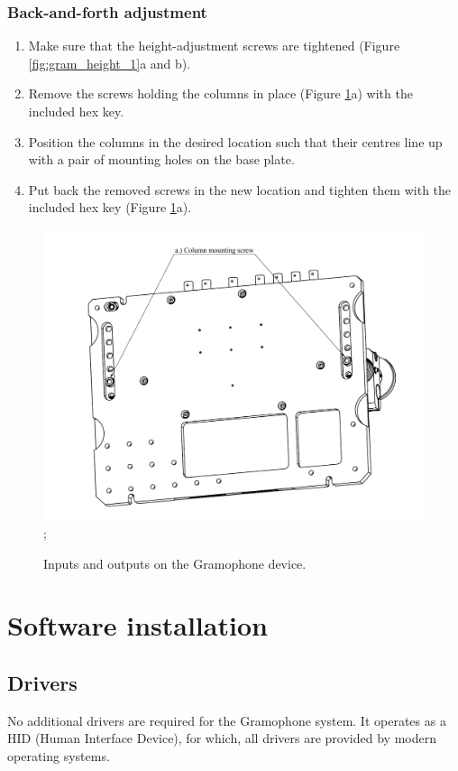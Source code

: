 \documentclass[11pt,a4paper]{article}
\begin{document}
\subsubsection{Back-and-forth adjustment}
\begin{enumerate}
\item Make sure that the height-adjustment screws are tightened (Figure \ref{fig:gram_height_1}a and b).
\item Remove the screws holding the columns in place (Figure \ref{fig:gram_back}a) with the included hex key.
\item Position the columns in the desired location such that their centres line up with a pair of mounting holes on the base plate.
\item Put back the removed screws in the new location and tighten them with the included hex key (Figure \ref{fig:gram_back}a).
\end{enumerate}

\begin{figure}[H] %
\centering
\includegraphics[clip, trim=1cm 0cm 0cm 0cm, width=1.00\textwidth]{labels_back.PDF};
\caption{Inputs and outputs on the Gramophone device.}
\label{fig:gram_back}
\end{figure}

\section{Software installation}
\subsection{Drivers}
No additional drivers are required for the Gramophone system. It operates as a HID (Human Interface Device), for which, all drivers are provided by modern operating systems.
\end{document}
